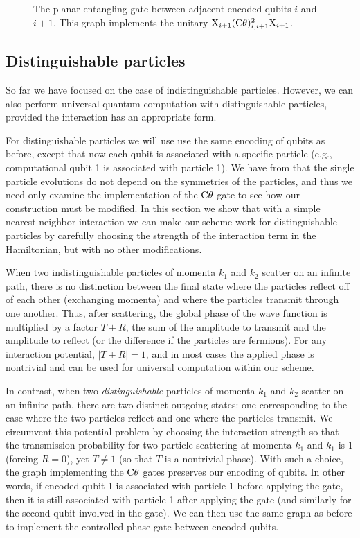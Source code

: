 \documentclass[../thesis-main/thesis-main]{subfiles}
\begin{document}
\begin{figure}
\centering
     
\caption{The planar entangling gate between adjacent encoded qubits $i$ and $i+1$. This graph implements the unitary $\mathrm{X}_{i+1} (\mathrm{C}\theta)^2_{i,i+1} \mathrm{X}_{i+1}$.}
\label{fig:PlanCPGate}
\end{figure}

\subsection{Distinguishable particles}

So far we have focused on the case of indistinguishable particles.  However, we can also perform universal quantum computation with distinguishable particles, provided the interaction has an appropriate form.

For distinguishable particles we will use use the same encoding of qubits as before, except that now each qubit is associated with a specific particle (e.g., computational qubit 1 is associated with particle 1). We have from  that the single particle evolutions do not depend on the symmetries of the particles, and thus we need only examine the implementation of the $\mathrm{C}\theta$ gate to see how our construction must be modified. In this section we show that with a simple nearest-neighbor interaction we can make our scheme work for distinguishable particles by carefully choosing the strength of the interaction term in the Hamiltonian, but with no other modifications.

When two indistinguishable particles of momenta $k_1$ and $k_2$ scatter on an infinite path, there is no distinction between the final state where the particles reflect off of each other (exchanging momenta) and where the particles transmit through one another. Thus, after scattering, the global phase of the wave function is multiplied by a factor $T\pm R$, the sum of the amplitude to transmit and the amplitude to reflect (or the difference if the particles are fermions). For any interaction potential, $|T\pm R|=1$, and in most cases the applied phase is nontrivial and can be used for universal computation within our scheme. 

In contrast, when two \textit{distinguishable} particles of momenta $k_1$ and $k_2$ scatter on an infinite path, there are two distinct outgoing states:  one corresponding to the case where the two particles reflect and one where the particles transmit.  We circumvent this potential problem by choosing the interaction strength so that the transmission probability for two-particle scattering at momenta $k_1$ and $k_1$ is $1$ (forcing $R=0$), yet $T\neq 1$ (so that $T$ is a nontrivial phase). With such a choice, the graph implementing the $\mathrm{C}\theta$ gates preserves our encoding of qubits. In other words, if encoded qubit 1 is associated with particle 1 before applying the gate, then it is still associated with particle 1 after applying the gate (and similarly for the second qubit involved in the gate). We can then use the same graph as before to implement the controlled phase gate between encoded qubits.
\end{document}
